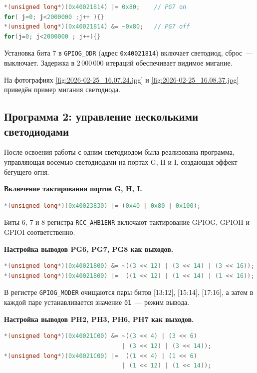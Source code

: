 \begin{lstlisting}[language=C]
*(unsigned long*)(0x40021814) |= 0x80;    // PG7 on
for( j=0; j<2000000 ;j++ ){}
*(unsigned long*)(0x40021814) &= ~0x80;   // PG7 off
for(j=0; j<2000000 ; j++){}
\end{lstlisting}

Установка бита 7 в \texttt{GPIOG\_ODR} (адрес \texttt{0x40021814}) включает светодиод, сброс~--- выключает. Задержка в 2\,000\,000 итераций обеспечивает видимое мигание.

На фотографиях \ref{fig:2026-02-25_16.07.24.jpg} и \ref{fig:2026-02-25_16.08.37.jpg} приведён пример мигания светодиода.


\subsection*{Программа 2: управление несколькими светодиодами}

После освоения работы с одним светодиодом была реализована программа, управляющая восемью светодиодами на портах G, H и I, создающая эффект бегущего огня.

\textbf{Включение тактирования портов G, H, I.}

\begin{lstlisting}[language=C]
*(unsigned long*)(0x40023830) |= (0x40 | 0x80 | 0x100);
\end{lstlisting}

Биты 6, 7 и 8 регистра \texttt{RCC\_AHB1ENR} включают тактирование GPIOG, GPIOH и GPIOI соответственно.

\textbf{Настройка выводов PG6, PG7, PG8 как выходов.}

\begin{lstlisting}[language=C]
*(unsigned long*)(0x40021800) &= ~((3 << 12) | (3 << 14) | (3 << 16));
*(unsigned long*)(0x40021800) |=  ((1 << 12) | (1 << 14) | (1 << 16));
\end{lstlisting}

В регистре \texttt{GPIOG\_MODER} очищаются пары битов [13:12], [15:14], [17:16], а затем в каждой паре устанавливается значение \texttt{01}~--- режим вывода.

\textbf{Настройка выводов PH2, PH3, PH6, PH7 как выходов.}

\begin{lstlisting}[language=C]
*(unsigned long*)(0x40021C00) &= ~((3 << 4) | (3 << 6)
                                 | (3 << 12) | (3 << 14));
*(unsigned long*)(0x40021C00) |=  ((1 << 4) | (1 << 6)
                                 | (1 << 12) | (1 << 14));
\end{lstlisting}

